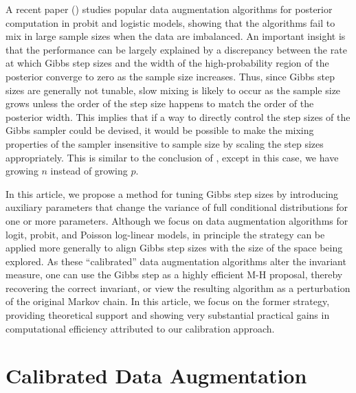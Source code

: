 \documentclass[10pt]{article}
\begin{document}
A recent paper (\cite{johndrow2016inefficiency}) studies popular data augmentation algorithms for posterior computation in probit \citep{albert1993bayesian} and logistic  \citep{polson2013bayesian} models, showing that the algorithms fail to mix in large sample sizes when the data are imbalanced. An important insight is that the performance can be largely explained by a discrepancy between the rate at which Gibbs step sizes and the width of the high-probability region of the posterior converge to zero as the sample size increases. Thus, since Gibbs step sizes are generally not tunable, slow mixing is likely to occur as the sample size grows unless the order of the step size happens to match the order of the posterior width. This implies that if a way to directly control the step sizes of the Gibbs sampler could be devised, it would be possible to make the mixing properties of the sampler insensitive to sample size by scaling the step sizes appropriately. This is similar to the conclusion of \cite{hairer2014spectral}, except in this case, we have growing $n$ instead of growing $p$.

In this article, we propose a method for tuning Gibbs step sizes by introducing auxiliary parameters that change the variance of full conditional distributions for one or more parameters. Although we focus on data augmentation algorithms for logit, probit, and Poisson log-linear models, in principle the strategy can be applied more generally to align Gibbs step sizes with the size of the space being explored. As these ``calibrated'' data augmentation algorithms alter the invariant measure, one can use the Gibbs step as a highly efficient M-H proposal, thereby recovering the correct invariant, or view the resulting algorithm as a perturbation of the original Markov chain.  In this article, we focus on the former strategy, providing theoretical support and showing very substantial practical gains in computational efficiency attributed to our calibration approach.


\section{Calibrated Data Augmentation}
\end{document}
